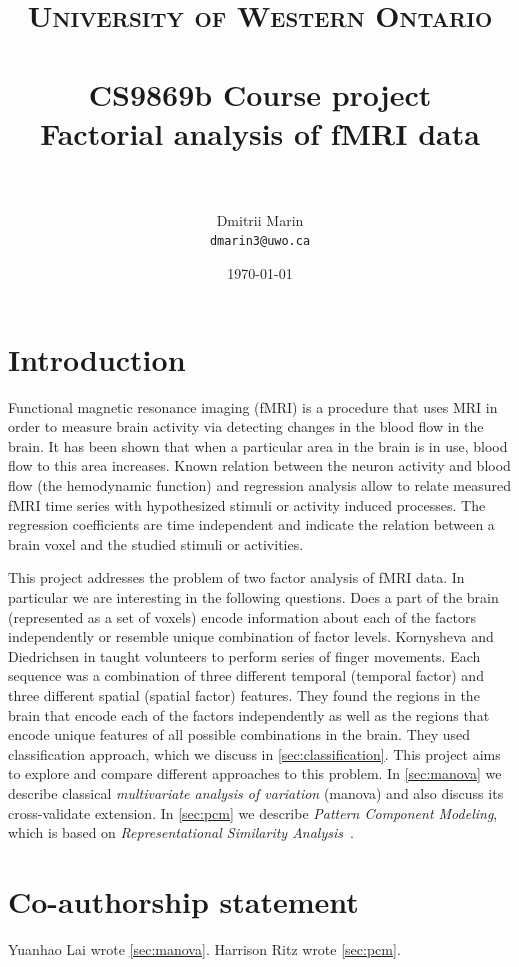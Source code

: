 \documentclass[paper=a4,fontsize=12pt]{scrartcl}
\title{	
\normalfont \normalsize 
\textsc{University of Western Ontario} \\ [25pt] %
\horrule{0.5pt} \\[0.4cm] %
\Large CS9869b Course project\\ \huge Factorial analysis of fMRI data  \\ %
\horrule{2pt} \\[0.5cm] %
}
\author{Dmitrii Marin \\ \small\tt dmarin3@uwo.ca} %
\date{\normalsize\today} %
\numberwithin{equation}{section} %
\numberwithin{figure}{section} %
\numberwithin{table}{section} %
\begin{document}
\maketitle %

\section*{Introduction}

Functional magnetic resonance imaging (fMRI) is a procedure that uses MRI in order to measure brain activity via detecting changes in the blood flow in the brain. It has been shown that when a particular area in the brain is in use, blood flow to this area increases\cite{ogawa1990brain,shmuel2002sustained}. Known relation between the neuron activity and blood flow (the hemodynamic function) and regression analysis allow to relate measured fMRI time series with hypothesized stimuli or activity induced processes\cite{huettel2004functional}. The regression coefficients are time independent and indicate the relation between a brain voxel and the studied stimuli or activities. 

This project addresses the problem of two factor analysis of fMRI data. In particular we are interesting in the following questions. Does a part of the brain (represented as a set of voxels) encode information about each of the factors independently or  resemble unique combination of factor levels. Kornysheva and Diedrichsen in \cite{Kornysheva2014} taught volunteers to perform series of finger movements. Each sequence was a combination of three different temporal (temporal factor) and three different spatial (spatial factor) features. They found the regions in the brain that encode each of the factors independently as well as the regions that encode unique features of all possible combinations in the brain. They used classification approach, which we discuss in \autoref{sec:classification}. This project aims to explore and compare different approaches to this problem. In \autoref{sec:manova} we describe classical \emph{multivariate analysis of variation} (manova) and also discuss its cross-validate extension. In \autoref{sec:pcm} we describe \emph{Pattern Component Modeling}\cite{Walther2016}, which is based on \emph{Representational Similarity Analysis}~\cite{kriegeskorte2008representational}.

\section*{Co-authorship statement}
Yuanhao Lai wrote \autoref{sec:manova}. Harrison Ritz wrote \autoref{sec:pcm}. 
\end{document}
